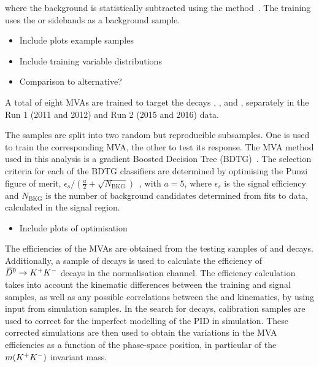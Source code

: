  where the background is statistically subtracted using the \sPlot method~\cite{Pivk:2004ty}. The training uses the \phiz or \Dsp sidebands as a background sample.
\begin{itemize}
\item Include plots example samples
\item Include training variable distributions
\item Comparison to alternative? 
\end{itemize}

A total of eight MVAs are trained to target the decays \decay{\phi}{\Kp\Km}, \decay{\Dsp}{\Kp\Km\pip}, \decay{\Dsp}{\Kp\pim\pip} and \decay{\Dsp}{\pip\pim\pip}, separately in the Run 1 (2011 and 2012) and Run 2 (2015 and 2016) data. 

The samples are split into two random but reproducible subsamples. One is used to train the corresponding MVA, the other to test its response. 
The MVA method used in this analysis is a gradient Boosted Decision Tree (BDTG)~\cite{Breiman}. The selection criteria for each of the BDTG classifiers are determined by optimising the Punzi figure of merit, $\epsilon_{s}/ (\frac{a}{2} + \sqrt{N_{\text{BKG}}})$~\cite{Punzi:2003bu}, with $a=5$, where $\epsilon_{s}$ is the signal efficiency and $N_{\text{BKG}}$ is the number of background candidates determined from fits to data, calculated in the signal region.
\begin{itemize}
\item Include plots of optimisation
\end{itemize}

The efficiencies of the MVAs are obtained from the testing samples of \decay{\Bs}{\jpsi\phiz} and \decay{\Bs}{\Dsp\pim} decays. Additionally, a sample of \decay{\Bp}{\Dz\pip} decays is used to calculate the efficiency of ${{\kern 0.2em\overline{\kern -0.2em D}{}}{}^0} \rightarrow {\ensuremath{{K}^+}} {\ensuremath{{K}^-}}$ decays in the normalisation channel. The efficiency calculation takes into account the kinematic differences between the training and signal samples, as well as any possible correlations between the \Dsp and \phiz kinematics, by using input from simulation samples. In the search for \decay{\Bp}{\Dsp\Kp\Km} decays, calibration samples are used to correct for the imperfect modelling of the PID in simulation. These corrected simulations are then used to obtain the variations in the MVA efficiencies as a function of the phase-space position, in particular of the $m({{K}^+}{{K}^-})$ invariant mass.



